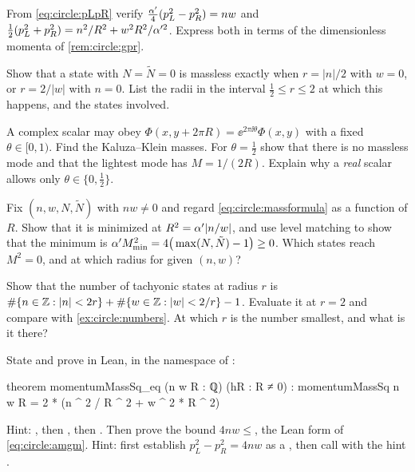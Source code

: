 \begin{exercise}
From \eqref{eq:circle:pLpR} verify $\frac{\alpha'}4(p_L^2-p_R^2)=nw$ and
$\frac12(p_L^2+p_R^2)=n^2/R^2+w^2R^2/\alpha'^2$. Express both in terms of the dimensionless
momenta of \cref{rem:circle:gpr}.
\end{exercise}

\begin{exercise}
Show that a state with $N=\tilde N=0$ is massless exactly when $r=|n|/2$ with $w=0$, or
$r=2/|w|$ with $n=0$. List the radii in the interval $\frac12\le r\le2$ at which this
happens, and the states involved.
\end{exercise}

\begin{exercise}
A complex scalar may obey $\Phi(x,y+2\pi R)=\ee^{2\pi\ii\theta}\Phi(x,y)$ with a fixed
$\theta\in[0,1)$. Find the Kaluza--Klein masses. For $\theta=\frac12$ show that there is no
massless mode and that the lightest mode has $M=1/(2R)$. Explain why a \emph{real} scalar
allows only $\theta\in\{0,\frac12\}$.
\end{exercise}

\begin{exercise}
Fix $(n,w,N,\tilde N)$ with $nw\neq0$ and regard \eqref{eq:circle:massformula} as a function
of $R$. Show that it is minimized at $R^2=\alpha'|n/w|$, and use level matching to show that the
minimum is $\alpha' M^2_{\min}=4\big(\max(N,\tilde N)-1\big)\ge0$. Which states reach
$M^2=0$, and at which radius for given $(n,w)$?
\end{exercise}

\begin{exercise}
Show that the number of tachyonic states at radius $r$ is
$\#\{n\in\mathbb{Z}:|n|<2r\}+\#\{w\in\mathbb{Z}:|w|<2/r\}-1$. Evaluate it at $r=2$ and compare with
\cref{ex:circle:numbers}. At which $r$ is the number smallest, and what is it there?
\end{exercise}

\begin{exercise}
State and prove in Lean, in the namespace of :
\begin{leancode}
theorem momentumMassSq_eq (n w R : ℚ) (hR : R ≠ 0) :
    momentumMassSq n w R = 2 * (n ^ 2 / R ^ 2 + w ^ 2 * R ^ 2)
\end{leancode}
Hint: , then , then . Then prove the bound
$4nw\le{}$, the Lean form of \eqref{eq:circle:amgm}. Hint: first
establish $p_L^2-p_R^2=4nw$ as a , then call  with the hint
.
\end{exercise}

